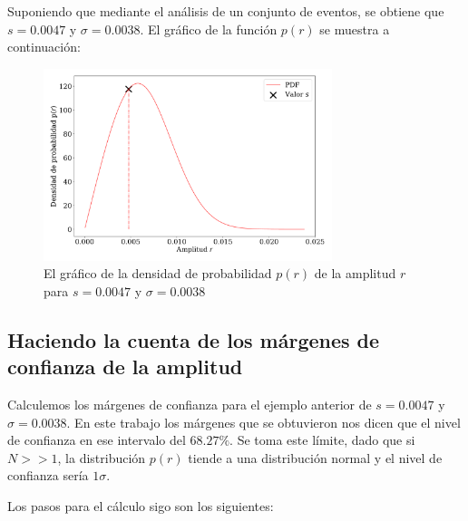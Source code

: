 Suponiendo que mediante el análisis de un conjunto de eventos, se obtiene que $s=0.0047$ y $\sigma=0.0038$. El gráfico de la función $p(r)$ se muestra a continuación:

\begin{figure}[H]
    \begin{small}
        \begin{center}
            \includegraphics[width=0.75\textwidth]{bessel_prob_value_s_v2.pdf}
        \end{center}
        \caption{El gráfico de la densidad de probabilidad $p(r)$ de la amplitud $r$ para $s=0.0047$ y $\sigma=0.0038$ }
    \end{small}
\end{figure}

\subsection{Haciendo la cuenta de los márgenes de confianza de la amplitud}

Calculemos los márgenes de confianza para el ejemplo anterior de $s=0.0047$ y $\sigma=0.0038$. En este trabajo los márgenes que se obtuvieron nos dicen que el nivel de confianza en ese intervalo del $68.27\%$. Se toma este límite, dado que si $N>>1$, la distribución $p(r)$ tiende a una distribución normal y el nivel de confianza sería $1\sigma$.

Los pasos para el cálculo sigo son los siguientes: 

